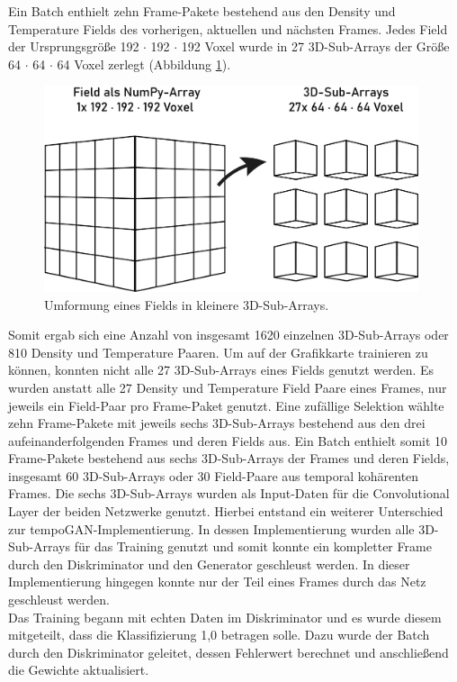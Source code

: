 Ein Batch enthielt zehn Frame-Pakete bestehend aus den Density und Temperature Fields des vorherigen, aktuellen und nächsten Frames. Jedes Field der Ursprungsgröße 192 $\cdot$ 192 $\cdot$ 192 Voxel wurde in 27 3D-Sub-Arrays der Größe 64 $\cdot$ 64 $\cdot$ 64 Voxel zerlegt (Abbildung \ref{fieldarray}). \\


\begin{figure}[ht]
    \centering
    \includegraphics[width=11cm]{bilder/fieldarray.jpg}
    \caption{Umformung eines Fields in kleinere 3D-Sub-Arrays.}
    \label{fieldarray}
\end{figure}


Somit ergab sich eine Anzahl von insgesamt 1620 einzelnen 3D-Sub-Arrays oder 810 Density und Temperature Paaren. Um auf der Grafikkarte trainieren zu können, konnten nicht alle 27 3D-Sub-Arrays eines Fields genutzt werden. Es wurden anstatt alle 27 Density und Temperature Field Paare eines Frames, nur jeweils ein Field-Paar pro Frame-Paket genutzt. Eine zufällige Selektion wählte  zehn Frame-Pakete mit jeweils sechs 3D-Sub-Arrays bestehend aus den drei aufeinanderfolgenden Frames und deren Fields aus. Ein Batch enthielt somit 10 Frame-Pakete bestehend aus sechs 3D-Sub-Arrays der Frames und deren Fields, insgesamt 60 3D-Sub-Arrays oder 30 Field-Paare aus temporal kohärenten Frames. Die sechs 3D-Sub-Arrays wurden als Input-Daten für die Convolutional Layer der beiden Netzwerke genutzt. Hierbei entstand ein weiterer Unterschied zur tempoGAN-Implementierung. In dessen Implementierung wurden alle 3D-Sub-Arrays für das Training genutzt und somit konnte ein kompletter Frame durch den Diskriminator und den Generator geschleust werden. In dieser Implementierung hingegen konnte nur der Teil eines Frames durch das Netz geschleust werden.\\

Das Training begann mit echten Daten im Diskriminator und es wurde diesem mitgeteilt, dass die Klassifizierung 1,0 betragen solle. Dazu wurde der Batch durch den Diskriminator geleitet, dessen Fehlerwert berechnet und anschließend die Gewichte aktualisiert.\\

